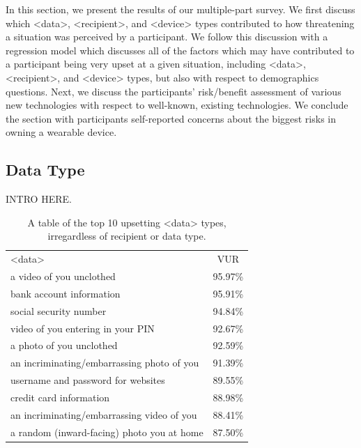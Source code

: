 \documentclass{acm_proc_article-sp}
\begin{document}
In this section, we present the results of our multiple-part survey. We first discuss which <data>, <recipient>, and <device> types contributed to how threatening a situation was perceived by a participant. We follow this discussion with a regression model which discusses all of the factors which may have contributed to a participant being very upset at a given situation, including <data>, <recipient>, and <device> types, but also with respect to demographics questions. Next, we discuss the participants' risk/benefit assessment of various new technologies with respect to well-known, existing technologies. We conclude the section with participants self-reported concerns about the biggest risks in owning a wearable device.  

\subsection{Data Type}
INTRO HERE. 

\begin{table}%
\begin{center}
\begin{tabular}{| l | c |}

<data> &  VUR  \\
a video of you unclothed & 95.97\% \\
bank account information & 95.91\% \\
social security number & 94.84\% \\
video of you entering in your PIN & 92.67\% \\
a photo of you unclothed & 92.59\% \\
an incriminating/embarrassing photo of you & 91.39\% \\
username and password for websites & 89.55\% \\
credit card information & 88.98\% \\
an incriminating/embarrassing video of you & 88.41\% \\
a random (inward-facing) photo you at home & 87.50\% \\

\end{tabular}
\caption{A table of the top 10 upsetting <data> types, irregardless of recipient or data type.}
\label{top10}
\end{center}
\end{table}
\end{document}
